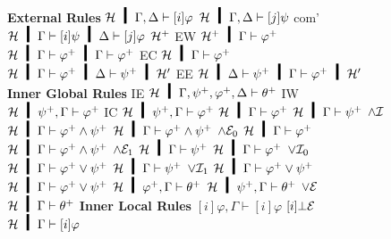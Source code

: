 {\begin{figure}
 \small
  \begin{center}
  \textbf{External Rules}
   \vskip 2mm
   \BinaryRule
   {$\hyper\hmid\Gamma,\Delta\vdash[i]\varphi$}
   {$\hyper\hmid\Gamma,\Delta\vdash[j]\psi$}
   {com'}
   {$\hyper\hmid\Gamma\vdash[i]\psi\hmid\Delta\vdash[j]\varphi$}
  \hfill
 \UnaryRule
 {$\mathcal{H}^+$}
 {EW}
 {$\hyper^+\hmid\Gamma\vdash \m\varphi$}
 \vskip 2mm
 \UnaryRule
 {$\hyper\hmid\Gamma\vdash \m\varphi\hmid\Gamma\vdash \m\varphi$}
 {EC}
 {$\hyper\hmid\Gamma\vdash \m\varphi$}
 \hfill
 \UnaryRule
 {$\hyper\hmid\Gamma\vdash \m\varphi\hmid\Delta\vdash \m\psi\hmid \hyper'$}
 {EE}
 {$\hyper\hmid\Delta\vdash \m\psi   \hmid\Gamma\vdash \m\varphi\hmid
   \hyper'$}
 \vskip 2mm
\textbf{Inner Global Rules}
\vskip 2mm
   \UnaryRule{$\hyper\hmid\Gamma,\m\varphi,\m\psi,\Delta\vdash\m\theta$}
   {IE}
   {$\hyper\hmid\Gamma,\m\psi,\m\varphi,\Delta\vdash \m\theta$}
   \hfill
   \UnaryRule{$\hyper\hmid\Gamma\vdash\m\varphi$}
   {IW}
   {$\hyper\hmid\m\psi,\Gamma\vdash\m\varphi$}
   \hfill
   \UnaryRule{$\hyper\hmid\m\psi,\m\psi,\Gamma\vdash\m\varphi$}
   {IC}
   {$\hyper\hmid\m\psi,\Gamma\vdash\m\varphi$}
   \vskip 2mm
  \BinaryRule
   {$\hyper\hmid\Gamma\vdash \m\varphi$}
   {$\hyper\hmid\Gamma\vdash \m\psi$}
   {$\wedge\mathcal I$}
   {$\hyper\hmid\Gamma\vdash \m\varphi\wedge\m\psi$}
   \vskip 2mm
  \UnaryRule
   {$\hyper\hmid\Gamma\vdash \m\varphi\wedge\m\psi$}
   {$\wedge\mathcal E_0$}
   {$\hyper\hmid\Gamma\vdash \m\varphi$}
   \hfill
  \UnaryRule
   {$\hyper\hmid\Gamma\vdash\m\varphi\wedge\m\psi$}
   {$\wedge\mathcal E_1$}
   {$\hyper\hmid\Gamma\vdash\m\psi$}
\vskip 2mm
  \UnaryRule
   {$\hyper\hmid\Gamma\vdash\m\varphi$}
   {$\vee\mathcal I_0$}
   {$\hyper\hmid\Gamma\vdash\m\varphi\vee\m\psi$}
   \hfill
  \UnaryRule
   {$\hyper\hmid\Gamma\vdash\m\psi$}
   {$\vee\mathcal I_1$}
   {$\hyper\hmid\Gamma\vdash\m\varphi\vee\m\psi$}
\vskip 2mm
   \TrinaryRule
   {$\hyper\hmid\Gamma\vdash           \m\varphi\vee\m\psi$}
   {$\hyper\hmid\m\varphi, \Gamma\vdash\m\theta$}
   {$\hyper\hmid\m\psi,    \Gamma\vdash\m\theta$}
   {$\vee\mathcal E$}
   {$\hyper\hmid         \Gamma\vdash\m\theta$}
\vskip 2mm
\textbf{Inner Local Rules}
\vskip 2mm
   {$[i]\varphi,\Gamma\vdash [i]\varphi$}
   \hfill
 \UnaryRule{$\hyper\hmid\Gamma\vdash[i]\bot$}
   {$[i]\bot\mathcal E$}
   {$\hyper\hmid\Gamma\vdash[i]\varphi$}
   \vskip 2mm
  \UnaryRule{$\hyper\hmid[i]\varphi,\Gamma\vdash [i]\psi$}

\end{center}
\end{figure}}
